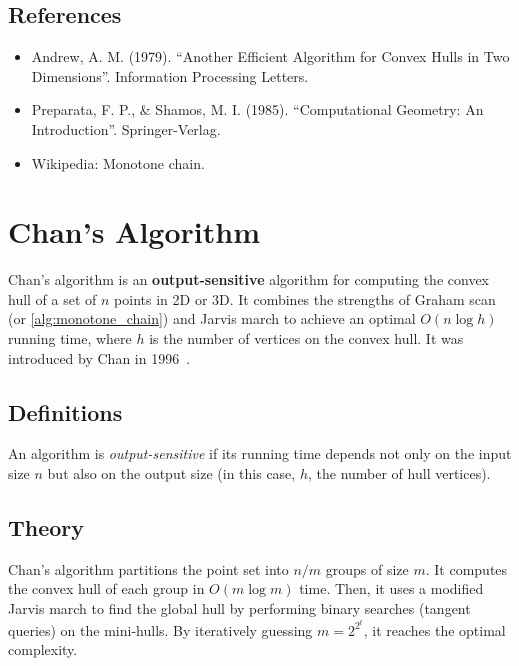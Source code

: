 \subsection{References}

\begin{itemize}
\item Andrew, A. M. (1979). ``Another Efficient Algorithm for Convex Hulls in Two Dimensions''. Information Processing Letters.
\item Preparata, F. P., \& Shamos, M. I. (1985). ``Computational Geometry: An Introduction''. Springer-Verlag.
\item Wikipedia: Monotone chain.
\end{itemize}


\section{Chan's Algorithm}
\label{sec:chans_algorithm}

Chan's algorithm is an \textbf{output-sensitive} algorithm for computing the convex hull of a set of $n$ points in 2D or 3D. It combines the strengths of Graham scan (or \cref{alg:monotone_chain}) and Jarvis march to achieve an optimal $O(n \log h)$ running time, where $h$ is the number of vertices on the convex hull. It was introduced by Chan in 1996~\cite{chan1996}.

\subsection{Definitions}

\begin{definition}\label{def:output_sensitive}
An algorithm is \emph{output-sensitive} if its running time depends not only on the input size $n$ but also on the output size (in this case, $h$, the number of hull vertices).
\end{definition}

\subsection{Theory}

Chan's algorithm partitions the point set into $n/m$ groups of size $m$. It computes the convex hull of each group in $O(m \log m)$ time. Then, it uses a modified Jarvis march to find the global hull by performing binary searches (tangent queries) on the mini-hulls. By iteratively guessing $m = 2^{2^t}$, it reaches the optimal complexity.

